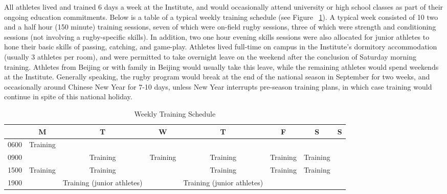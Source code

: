 \begin{CJK}{UTF8}{gbsn}
 All athletes lived and trained 6 days a week at the Institute, and would occasionally attend university or high school classes as part of their ongoing education commitments.  Below is a table of a typical weekly training schedule (see Figure ~\ref{tab:tournamentData}). A typical week consisted of 10 two and a half hour (150 minute) training sessions, seven of which were on-field rugby sessions, three of which were strength and conditioning sessions (not involving a rugby-specific skills).  In addition, two one hour evening skills sessions were also allocated for junior athletes to hone their basic skills of passing, catching, and game-play.  Athletes lived full-time on campus in the Institute's dormitory accommodation (usually 3 athletes per room), and were permitted to take overnight leave on the weekend after the conclusion of Saturday morning training.  Athletes from Beijing or with family in Beijing would usually take this leave, while the remaining athletes would spend weekends at the Institute.  Generally speaking, the rugby program would break at the end of the national season in September for two weeks, and occasionally around Chinese New Year for 7-10 days, unless New Year interrupts pre-season training plans, in which case training would continue in spite of this national holiday.

  \begin{landscape}
    \begin{table}[htpb]\caption{Weekly Training Schedule}
      \begin{center}
        \begin{small}
            \begin{tabular}{| c | c | c | c | c | c | c | c |}
              \hline
              & \bf M & \bf T & \bf W & \bf T & \bf F & \bf S & \bf S \\
              \hline
              0600 & Training &  &  & & & & \\
              \hline
              0900 &  & Training & Training & Training & Training & Training &  \\
                \hline
              1500 & Training & Training & & Training & Training & Training &  \\
                \hline
              1900 &  & Training (junior athletes) & & Training (junior athletes) & & & \\
                 \hline
            \end{tabular}
                \label{tab:tournamentData}
          \end{small}
        \end{center}
      \end{table}
  \end{landscape}
  \restoregeometry





\end{CJK}
